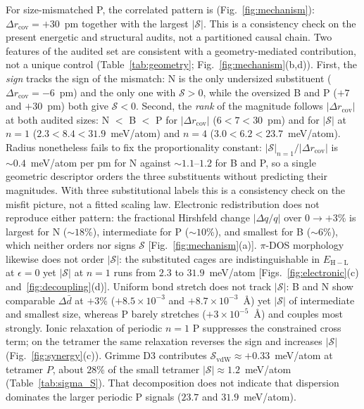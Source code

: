 \documentclass[%
 reprint,
 groupedaddress,
 amsmath,amssymb,
 aps,
 prb,
 floatfix,
]{revtex4-2}
\begin{document}
For size-mismatched P, the correlated pattern is (Fig.~\ref{fig:mechanism}): $\Delta r_{\mathrm{cov}}{=}+30$~pm together with the largest $|\mathcal{S}|$.
This is a consistency check on the present energetic and structural audits, not a partitioned causal chain.
Two features of the audited set are consistent with a geometry-mediated contribution, not a unique control (Table~\ref{tab:geometry}; Fig.~\ref{fig:mechanism}(b,d)).
First, the \emph{sign} tracks the sign of the mismatch: N is the only undersized substituent ($\Delta r_{\mathrm{cov}}{=}-6$~pm) and the only one with $\mathcal{S}>0$, while the oversized B and P ($+7$ and $+30$~pm) both give $\mathcal{S}<0$.
Second, the \emph{rank} of the magnitude follows $|\Delta r_{\mathrm{cov}}|$ at both audited sizes: N $<$ B $<$ P for $|\Delta r_{\mathrm{cov}}|$ ($6<7<30$~pm) and for $|\mathcal{S}|$ at $n{=}1$ ($2.3<8.4<31.9$~meV/atom) and $n{=}4$ ($3.0<6.2<23.7$~meV/atom).
Radius nonetheless fails to fix the proportionality constant: $|\mathcal{S}|_{n=1}/|\Delta r_{\mathrm{cov}}|$ is ${\sim}0.4$~meV/atom per pm for N against ${\sim}1.1$--$1.2$ for B and P, so a single geometric descriptor orders the three substituents without predicting their magnitudes.
With three substitutional labels this is a consistency check on the misfit picture, not a fitted scaling law.
Electronic redistribution does not reproduce either pattern: the fractional Hirshfeld change $|\Delta q/q|$ over $0\to{+}3$\% is largest for N (${\sim}18$\%), intermediate for P (${\sim}10$\%), and smallest for B (${\sim}6$\%), which neither orders nor signs $\mathcal{S}$ [Fig.~\ref{fig:mechanism}(a)].
$\pi$-DOS morphology likewise does not order $|\mathcal{S}|$: the substituted cages are indistinguishable in $E_{\mathrm{H-L}}$ at $\epsilon{=}0$ yet $|\mathcal{S}|$ at $n{=}1$ runs from $2.3$ to $31.9$~meV/atom [Figs.~\ref{fig:electronic}(c) and~\ref{fig:decoupling}(d)].
Uniform bond stretch does not track $|\mathcal{S}|$: B and N show comparable $\Delta\bar{d}$ at $+3$\% ($+8.5\times 10^{-3}$ and $+8.7\times 10^{-3}$~\AA) yet $|\mathcal{S}|$ of intermediate and smallest size, whereas P barely stretches ($+3\times 10^{-5}$~\AA) and couples most strongly.
Ionic relaxation of periodic $n{=}1$ P suppresses the constrained cross term; on the tetramer the same relaxation reverses the sign and increases $|\mathcal{S}|$ (Fig.~\ref{fig:synergy}(c)).
Grimme D3 contributes $\mathcal{S}_{\mathrm{vdW}}\approx +0.33$~meV/atom at tetramer $P$, about $28$\% of the small tetramer $|\mathcal{S}|\approx 1.2$~meV/atom (Table~\ref{tab:sigma_S}).
That decomposition does not indicate that dispersion dominates the larger periodic P signals ($23.7$ and $31.9$~meV/atom).
\end{document}
